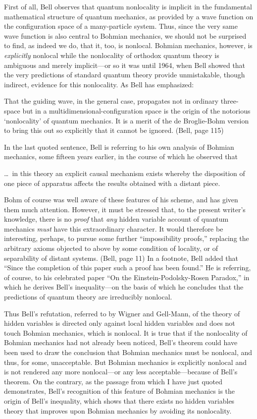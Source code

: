 First of all, Bell observes that quantum nonlocality is implicit in the
fundamental mathematical structure of quantum mechanics, as provided by a
wave function on the configuration space of a many-particle system. Thus,
since the very same wave function is also central to Bohmian mechanics, we
should not be surprised to find, as indeed we do, that it, too, is
nonlocal. Bohmian mechanics, however, is {\it explicitly\/} nonlocal while the
nonlocality of orthodox quantum theory is ambiguous and merely
implicit---or so it was until 1964, when Bell showed that the very
predictions of standard quantum theory provide unmistakable, though
indirect, evidence for this nonlocality. As Bell has emphasized:

\bq That the guiding wave, in the general case, propagates not in ordinary
three-space but in a multidimensional-configuration space is the origin of
the notorious `nonlocality' of quantum mechanics. It is a merit of the de
Broglie-Bohm version to bring this out so explicitly that it cannot be
ignored. (Bell, page 115)
\eq

In the last quoted sentence, Bell is referring to his own analysis of
Bohmian mechanics, some fifteen years earlier, in the course of which he
observed that

\bq \noindent
\dots\  in this theory an explicit causal mechanism exists whereby the
disposition of one piece of apparatus affects the results obtained with a
distant piece.

Bohm of course was well aware of these features of his scheme, and has
given them much attention. However, it must be stressed that, to the
present writer's knowledge, there is no {\it proof\/} that {\it any\/}
hidden variable account of quantum mechanics {\it must\/} have this
extraordinary character. It would therefore be interesting, perhaps, to
pursue some further ``impossibility proofs,'' replacing the arbitrary
axioms objected to above by some condition of locality, or of separability
of distant systems. (Bell, page 11)
\eq
In a footnote, Bell added that ``Since the completion of this paper such a
proof has been found.'' He is referring, of course, to his celebrated paper
\cite{Bell1}
``On the Einstein-Podolsky-Rosen Paradox,'' in which he derives Bell's
inequality---on the basis of which he concludes that the predictions of quantum
theory are irreducibly nonlocal.

Thus Bell's refutation, referred to by Wigner and Gell-Mann, of the theory
of hidden variables is directed only against local hidden variables and
does not touch Bohmian mechanics, which is nonlocal.  It is true that if
the nonlocality of Bohmian mechanics had not already been noticed, Bell's
theorem could have been used to draw the conclusion that Bohmian mechanics
must be nonlocal, and thus, for some, unacceptable. But Bohmian mechanics
is explicitly nonlocal and is not rendered any more nonlocal---or any less
acceptable---because of Bell's theorem.  On the contrary, as the passage
{}from which I have just quoted demonstrates, Bell's recognition of this
feature of Bohmian mechanics is the origin of Bell's inequality, which
shows that there exists no hidden variables theory that improves upon
Bohmian mechanics by avoiding its nonlocality.

